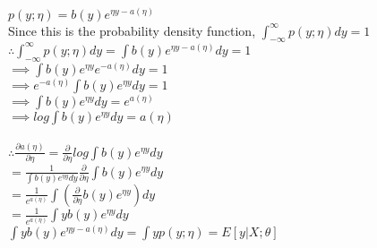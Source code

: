 \begin{answer}\\
$p(y;\eta)=b(y)e^{\eta y -a(\eta)}$\\
Since this is the probability density function, $\int_{- \infty}^{\infty}p(y;\eta)dy=1$\\
$\therefore \int_{- \infty}^{\infty}p(y;\eta)dy=\int b(y)e^{\eta y -a(\eta)}dy=1$\\
$\implies \int b(y)e^{\eta y} e^{-a(\eta)}dy=1$\\
$\implies e^{-a(\eta)} \int b(y)e^{\eta y}dy=1$\\
$\implies \int b(y)e^{\eta y}dy=e^{a(\eta)}$\\
$\implies log \int b(y)e^{\eta y}dy=a(\eta)$\\\\
$\therefore \frac{\partial a(\eta)}{\partial \eta}=\frac{\partial}{\partial \eta} log \int b(y)e^{\eta y}dy$\\
$=\frac{1}{\int b(y)e^{\eta y}dy} \frac{\partial}{\partial \eta} \int b(y)e^{\eta y}dy$\\
$=\frac{1}{e^{a(\eta)}} \int (\frac{\partial}{\partial \eta} b(y)e^{\eta y})dy$\\
$=\frac{1}{e^{a(\eta)}} \int y b(y)e^{\eta y}dy$\\
$\int y b(y)e^{\eta y - a(\eta)}dy=\int y p(y;\eta) = E[y|X; \theta]$\\
\end{answer}
